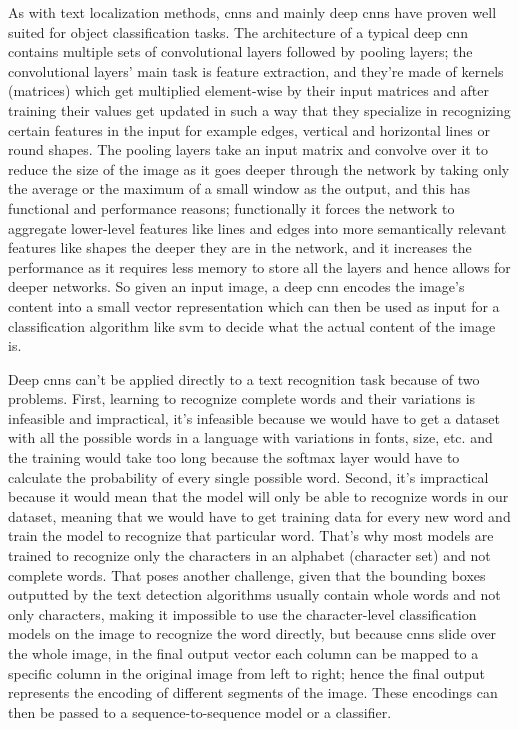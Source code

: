 As with text localization methods, \gls{cnn}s and mainly deep \gls{cnn}s have proven well suited for object classification tasks. The architecture of a typical deep \gls{cnn} contains multiple sets of convolutional layers followed by pooling layers; the convolutional layers' main task is feature extraction, and they're made of kernels (matrices) which get multiplied element-wise by their input matrices and after training their values get updated in such a way that they specialize in recognizing certain features in the input for example edges, vertical and horizontal lines or round shapes. The pooling layers take an input matrix and convolve over it to reduce the size of the image as it goes deeper through the network by taking only the average or the maximum of a small window as the output, and this has functional and performance reasons; functionally it forces the network to aggregate lower-level features like lines and edges into more semantically relevant features like shapes the deeper they are in the network, and it increases the performance as it requires less memory to store all the layers and hence allows for deeper networks. So given an input image, a deep \gls{cnn} encodes the image's content into a small vector representation which can then be used as input for a classification algorithm like \gls{svm} to decide what the actual content of the image is.

Deep \gls{cnn}s can't be applied directly to a text recognition task because of two problems. First, learning to recognize complete words and their variations is infeasible and impractical, it's infeasible because we would have to get a dataset with all the possible words in a language with variations in fonts, size, etc. and the training would take too long because the softmax layer would have to calculate the probability of every single possible word. Second, it's impractical because it would mean that the model will only be able to recognize words in our dataset, meaning that we would have to get training data for every new word and train the model to recognize that particular word. That's why most models are trained to recognize only the characters in an alphabet (character set) and not complete words. That poses another challenge, given that the bounding boxes outputted by the text detection algorithms usually contain whole words and not only characters, making it impossible to use the character-level classification models on the image to recognize the word directly, but because \gls{cnn}s slide over the whole image, in the final output vector each column can be mapped to a specific column in the original image from left to right; hence the final output represents the encoding of different segments of the image. These encodings can then be passed to a sequence-to-sequence model or a classifier.

